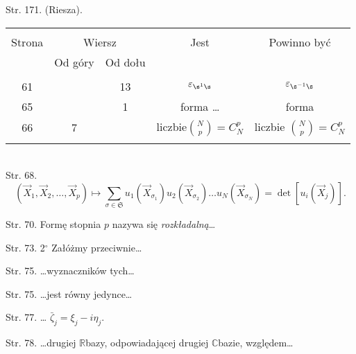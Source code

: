 \documentclass[a4paper,11pt]{article}
\newcommand{\veps}{\varepsilon}
\begin{document}
\start Str. 171. \large{(Riesza)}.



\newpage







\begin{center}
  \begin{tabular}{|c|c|c|c|c|}
    \hline
    & \multicolumn{2}{c|}{} & & \\
    Strona & \multicolumn{2}{c|}{Wiersz}& Jest & Powinno być \\ \cline{2-3}
    & Od góry & Od dołu &  &  \\ \hline
    & & & & \\
    61 & & 13 & $\veps_{ \s^{ 1 } \s }$ & $\veps_{ \s^{ -1 } \s }$ \\
    65 & & 1 & forma \ldots & forma \\
    66 & 7 & & liczbie${ N\choose p } =  C^{ p }_{ N } $
           & liczbie ${ N\choose p } =  C^{ p }_{ N } $ \\
    & & & & \\ \hline
  \end{tabular}
\end{center}
\noi \\
\start Str. 68.
$$( \vec{ X }_{ 1 }, \vec{ X }_{ 2 }, \ldots, \vec{ X }_{ p })
\mapsto \sum_{\sigma \in \mathfrak{ S } } u_{ 1 }( \vec{ X }_{
  \sigma_{ 1 } } ) u_{ 2 }( \vec{ X }_{ \sigma_{ 2 } } ) \ldots u_{ N
}( \vec{ X }_{ \sigma_{ N } } ) = \det[ u_{ i }( \vec{ X }_{ j } ) ]
\textrm{.}$$

\start Str. 70. Formę stopnia $p$ nazywa się \emph{rozkładalną}\ldots

\start Str. 73. 2$^{\circ}$ Załóżmy przeciwnie\ldots

\start Str. 75. \ldots wyznaczników tych\ldots

\start Str. 75. \ldots jest równy jedynce\ldots

\start Str. 77. \ldots
$\bar{ \zeta }_{ j } = \xi_{ j } - i \eta_{ j }$.

\start Str. 78. \ldots drugiej $\mathbb{R}$\dywiz bazy, odpowiadającej
drugiej $\mathbb{C}$\dywiz bazie, względem\ldots
\end{document}

